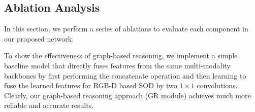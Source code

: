 \documentclass[runningheads]{llncs}
\begin{document}
\subsection{Ablation Analysis}
In this section, we perform a series of ablations to evaluate each component in our proposed network.

 To show the effectiveness of graph-based reasoning, we implement a simple baseline model that directly fuses features from the same multi-modality backbones by first performing the concatenate operation and then learning to fuse the learned features for RGB-D based SOD by two $1\times1$ convolutions. Clearly, our graph-based reasoning approach (GR module) achieves much more reliable and accurate results. 
\end{document}
